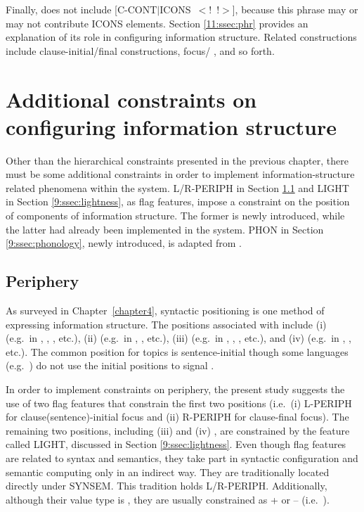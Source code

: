 \noindent Finally,  does not include
\mbox{[C-CONT{$\mid$}ICONS \ensuremath{<}!  !\ensuremath{>}]}, because
this phrase may or may not contribute ICONS
elements. Section \ref{11:ssec:phr} provides an explanation of its role in
configuring information structure. Related constructions include
clause-initial/final  constructions, focus/
, and so forth.



\section{Additional constraints on configuring information structure}
\label{9:sec:other-constraints}

Other than the hierarchical constraints presented in the previous
chapter, there must be some additional constraints in order to
implement information-structure related phenomena within the \lingo
{} system.  L/R-PERIPH in Section \ref{9:ssec:periphery}
and LIGHT in Section \ref{9:ssec:lightness}, as flag features,
impose a constraint on the position of components of information
structure. The former is newly introduced, while the latter had
already been implemented in the system. PHON in
Section \ref{9:ssec:phonology}, newly introduced, is adapted from
\citet{bildhauer:07}.


\subsection{Periphery}
\label{9:ssec:periphery}


As surveyed in Chapter~\ref{chapter4}, syntactic positioning is one
method of expressing information structure. The positions associated with  include (i)
 (e.g.\ in , ,
, etc.), (ii)  (e.g.\ in ,
, etc.), (iii)  (e.g.\ in
, , , etc.), and (iv)
 (e.g.\ in , ,
etc.). The common position for topics is sentence-initial though some
languages (e.g.\ ) do not use the initial positions to
signal .


In order to implement constraints on periphery, the present study
suggests the use of two flag features that constrain the first two
 positions (i.e.\ (i) L-PERIPH for clause(sentence)-initial
focus and (ii) R-PERIPH for clause-final
focus).
The remaining two positions, including (iii)  and (iv)
, are constrained by the feature called
LIGHT, discussed in Section \ref{9:ssec:lightness}.
Even though flag features are related to syntax and semantics, they
take part in syntactic configuration and semantic computing only in an
indirect way. They are traditionally located directly under
SYNSEM. This tradition holds L/R-PERIPH. Additionally, although their
value type is , they are usually constrained as + or --
(i.e.\ ).



